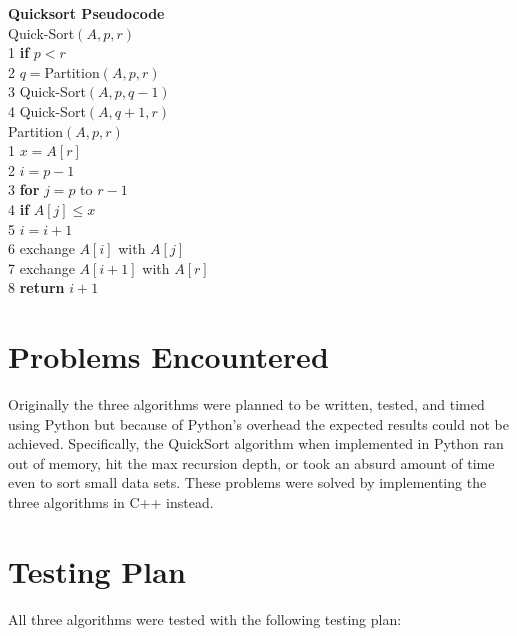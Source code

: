 \documentclass[a4paper]{article}
\begin{document}
    \vspace{1cm}
    \textbf{Quicksort Pseudocode} \\
    Quick-Sort$(A, p, r)$ \\
    1 \textbf{if} $p<r$ \\
    2 \phantom{hell}$q = $Partition$(A, p, r)$ \\
    3 \phantom{hell}Quick-Sort$(A, p, q-1)$ \\
    4 \phantom{hell}Quick-Sort$(A, q+1, r)$ \\

    Partition$(A, p, r)$ \\
    1 $x = A[r]$ \\
    2 $i = p - 1$ \\
    3 \textbf{for} $j = p$ to $r - 1$ \\
    4 \phantom{hell}\textbf{if} $A[j] \leq x$ \\
    5 \phantom{hellhell}$i = i + 1$ \\
    6 \phantom{hellhell}exchange $A[i]$ with $A[j]$ \\
    7 exchange $A[i + 1]$ with $A[r]$ \\
    8 \textbf{return} $i + 1$ \\



    \newpage
    \section{Problems Encountered}
    Originally the three algorithms were planned to be written, tested, and timed using
    Python but because of Python's overhead the expected results could not be achieved.
    Specifically, the QuickSort algorithm when implemented in Python ran out of memory, 
    hit the max recursion depth, or took an absurd amount of time even to sort small data
    sets. These problems were solved by implementing the three algorithms in C++ instead.

    \section{Testing Plan}
    All three algorithms were tested with the following testing plan: \\
\end{document}
